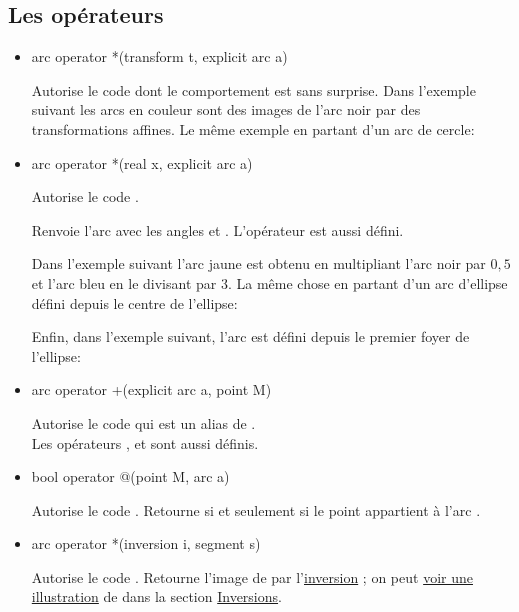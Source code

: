 \documentclass[pdftex]{article}
\newcommand{\ssi}{si et seulement si\xspace}
\begin{document}
\subsection{Les opérateurs}
\begin{itemize}
\item {}
  \begin{Vcolor}
    arc operator *(transform t, explicit arc a)
  \end{Vcolor}
  Autorise le code  dont le comportement est sans
  surprise. Dans l'exemple suivant les arcs en couleur sont des images
  de l'arc noir par des transformations affines.
  Le même exemple en partant d'un arc de cercle:

\item {}
  \begin{Vcolor}
    arc operator *(real x, explicit arc a)
  \end{Vcolor}
  Autorise le code .

  Renvoie l'arc  avec les
  angles 
  et . L'opérateur
   est aussi défini.

  Dans l'exemple suivant l'arc jaune est obtenu en multipliant l'arc
  noir par $0,5$ et l'arc bleu en le divisant par 3.
  La même chose en partant d'un arc d'ellipse défini depuis le centre
  de l'ellipse:

  Enfin, dans l'exemple suivant, l'arc est défini depuis le premier
  foyer de l'ellipse:
\item {}%
  \begin{Vcolor}
    arc operator +(explicit arc a, point M)
  \end{Vcolor}
  Autorise le code  qui est un alias de
  .\\
  Les opérateurs
  ,  et
   sont aussi définis.
\item {}
  \begin{Vcolor}
    bool operator @(point M, arc a)
  \end{Vcolor}
  Autorise le code . Retourne  \ssi le
  point  appartient à l'arc .
\item {}
  \begin{Vcolor}
    arc operator *(inversion i, segment s)
  \end{Vcolor}
  Autorise le code .
  Retourne l'image de  par
  l'\href{#section.inversions}{inversion} ; on peut
  \href{#inversion_damier}{voir une illustration} de
   dans la section \href{#section.inversion}{Inversions}.
\end{itemize}
\end{document}
